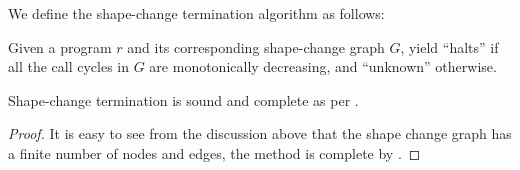 We define the shape-change termination algorithm as follows:

\begin{definition}\label{definition:shape-change-algorithm} Given a program $r$
and its corresponding shape-change graph $G$, yield ``halts'' if all the call
cycles in $G$ are monotonically decreasing, and ``unknown''
otherwise.\end{definition}

\begin{theorem} Shape-change termination is sound and complete as per
.\end{theorem}

\begin{proof} It is easy to see from the discussion above that the shape change
graph has a finite number of nodes and edges, the method is complete by
. \end{proof}
